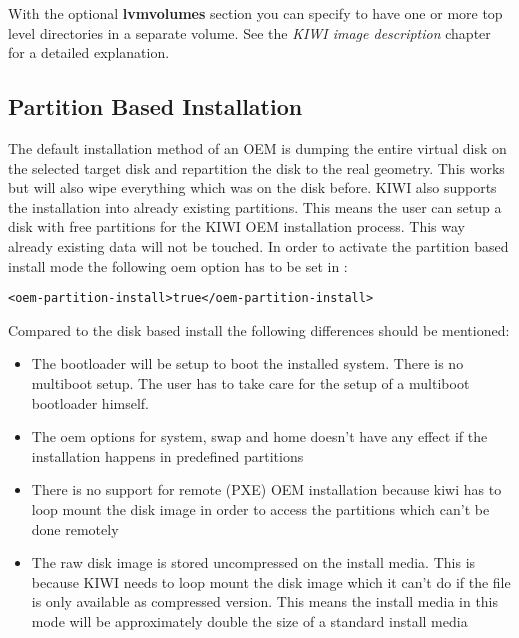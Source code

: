 With the optional \textbf{lvmvolumes} section you can specify to have 
one or more top level directories in a separate volume. See the
\textit{KIWI image description} chapter for a detailed explanation.

\subsection{Partition Based Installation}

The default installation method of an OEM is dumping the entire
virtual disk on the selected target disk and repartition the disk
to the real geometry. This works but will also wipe everything which
was on the disk before. KIWI also supports the installation into
already existing partitions. This means the user can setup a disk
with free partitions for the KIWI OEM installation process. This
way already existing data will not be touched. In order to activate
the partition based install mode the following oem option has to
be set in :

\begin{Command}{14cm}
\begin{verbatim}
<oem-partition-install>true</oem-partition-install>
\end{verbatim}
\end{Command}

Compared to the disk based install the following differences
should be mentioned:

\begin{itemize}
\item The bootloader will be setup to boot the installed system. There
      is no multiboot setup. The user has to take care for the setup
      of a multiboot bootloader himself.
\item The oem options for system, swap and home doesn't have any effect
      if the installation happens in predefined partitions
\item There is no support for remote (PXE) OEM installation because kiwi
      has to loop mount the disk image in order to access the partitions
      which can't be done remotely
\item The raw disk image is stored uncompressed on the install media.
      This is because KIWI needs to loop mount the disk image which it can't
      do if the file is only available as compressed version. This means
      the install media in this mode will be approximately double the size
      of a standard install media
\end{itemize}
